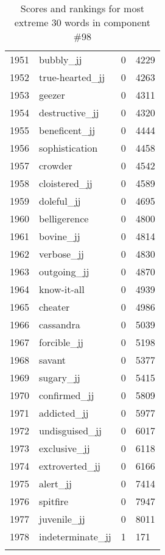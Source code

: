 \begin{longtable}[!htbp]{| rlr@{.}l |}
    1951 & bubbly\_jj & 0 & 4229 \\
    1952 & true-hearted\_jj & 0 & 4263 \\
    1953 & geezer & 0 & 4311 \\
    1954 & destructive\_jj & 0 & 4320 \\
    1955 & beneficent\_jj & 0 & 4444 \\
    1956 & sophistication & 0 & 4458 \\
    1957 & crowder & 0 & 4542 \\
    1958 & cloistered\_jj & 0 & 4589 \\
    1959 & doleful\_jj & 0 & 4695 \\
    1960 & belligerence & 0 & 4800 \\
    1961 & bovine\_jj & 0 & 4814 \\
    1962 & verbose\_jj & 0 & 4830 \\
    1963 & outgoing\_jj & 0 & 4870 \\
    1964 & know-it-all & 0 & 4939 \\
    1965 & cheater & 0 & 4986 \\
    1966 & cassandra & 0 & 5039 \\
    1967 & forcible\_jj & 0 & 5198 \\
    1968 & savant & 0 & 5377 \\
    1969 & sugary\_jj & 0 & 5415 \\
    1970 & confirmed\_jj & 0 & 5809 \\
    1971 & addicted\_jj & 0 & 5977 \\
    1972 & undisguised\_jj & 0 & 6017 \\
    1973 & exclusive\_jj & 0 & 6118 \\
    1974 & extroverted\_jj & 0 & 6166 \\
    1975 & alert\_jj & 0 & 7414 \\
    1976 & spitfire & 0 & 7947 \\
    1977 & juvenile\_jj & 0 & 8011 \\
    1978 & indeterminate\_jj & 1 & 171 \\
    \hline
    \caption{Scores and rankings for most extreme 30 words in component \#98} \\
\end{longtable}
